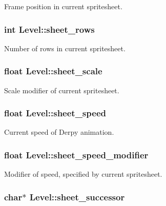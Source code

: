 Frame position in current spritesheet. \hypertarget{structLevel_a6d608b79c9b4dd8a5efc0c7e5fb482b0}{
\subsubsection[{sheet\-\_\-rows}]{\setlength{\rightskip}{0pt plus 5cm}int Level\-::sheet\-\_\-rows}}\label{structLevel_a6d608b79c9b4dd8a5efc0c7e5fb482b0}
Number of rows in current spritesheet. \hypertarget{structLevel_a267a140bd3de1fc3f23a88623de425ed}{
\subsubsection[{sheet\-\_\-scale}]{\setlength{\rightskip}{0pt plus 5cm}float Level\-::sheet\-\_\-scale}}\label{structLevel_a267a140bd3de1fc3f23a88623de425ed}
Scale modifier of current spritesheet. \hypertarget{structLevel_a41db1345ac158898450907010a49748f}{
\subsubsection[{sheet\-\_\-speed}]{\setlength{\rightskip}{0pt plus 5cm}float Level\-::sheet\-\_\-speed}}\label{structLevel_a41db1345ac158898450907010a49748f}
Current speed of Derpy animation. \hypertarget{structLevel_a3cae10fd441bcc14b6a47dd5fedafa59}{
\subsubsection[{sheet\-\_\-speed\-\_\-modifier}]{\setlength{\rightskip}{0pt plus 5cm}float Level\-::sheet\-\_\-speed\-\_\-modifier}}\label{structLevel_a3cae10fd441bcc14b6a47dd5fedafa59}
Modifier of speed, specified by current spritesheet. \hypertarget{structLevel_adfecc93d9f14b4725534aa36f5a79c64}{
\subsubsection[{sheet\-\_\-successor}]{\setlength{\rightskip}{0pt plus 5cm}char$\ast$ Level\-::sheet\-\_\-successor}}\label{structLevel_adfecc93d9f14b4725534aa36f5a79c64}
